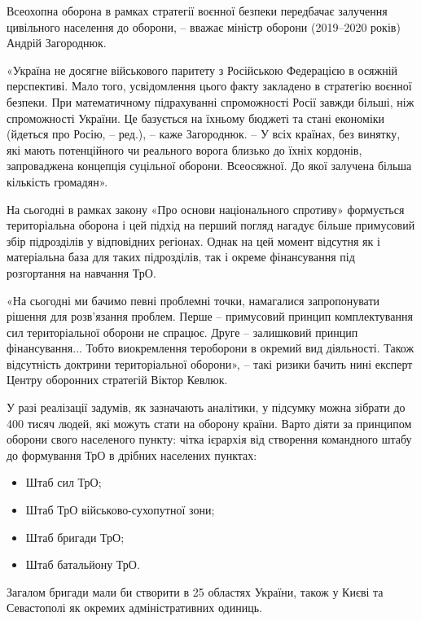 
Всеохопна оборона в рамках стратегії воєнної безпеки передбачає залучення
цивільного населення до оборони, – вважає міністр оборони (2019–2020 років)
Андрій Загороднюк.

«Україна не досягне військового паритету з Російською Федерацією в осяжній
перспективі. Мало того, усвідомлення цього факту закладено в стратегію воєнної
безпеки. При математичному підрахуванні спроможності Росії завжди більші, ніж
спроможності України. Це базується на їхньому бюджеті та стані економіки
(йдеться про Росію, – ред.), – каже Загороднюк. – У всіх країнах, без винятку,
які мають потенційного чи реального ворога близько до їхніх кордонів,
запроваджена концепція суцільної оборони. Всеосяжної. До якої залучена більша
кількість громадян».

На сьогодні в рамках закону «Про основи національного спротиву» формується
територіальна оборона і цей підхід на перший погляд нагадує більше примусовий
збір підрозділів у відповідних регіонах. Однак на цей момент відсутня як і
матеріальна база для таких підрозділів, так і окреме фінансування під
розгортання на навчання ТрО.

«На сьогодні ми бачимо певні проблемні точки, намагалися запропонувати рішення
для розв’язання проблем. Перше – примусовий принцип комплектування сил
територіальної оборони не спрацює. Друге – залишковий принцип фінансування...
Тобто виокремлення тероборони в окремий вид діяльності. Також відсутність
доктрини територіальної оборони», – такі ризики бачить нині експерт Центру
оборонних стратегій Віктор Кевлюк.


У разі реалізації задумів, як зазначають аналітики, у підсумку можна зібрати до
400 тисяч людей, які можуть стати на оборону країни. Варто діяти за принципом
оборони свого населеного пункту: чітка ієрархія від створення командного штабу
до формування ТрО в дрібних населених пунктах:

\begin{itemize}
  \item Штаб сил ТрО;
  \item Штаб ТрО військово-сухопутної зони;
  \item Штаб бригади ТрО;
  \item Штаб батальйону ТрО.
\end{itemize}

Загалом бригади мали би створити в 25 областях України, також у Києві та
Севастополі як окремих адміністративних одиниць.

